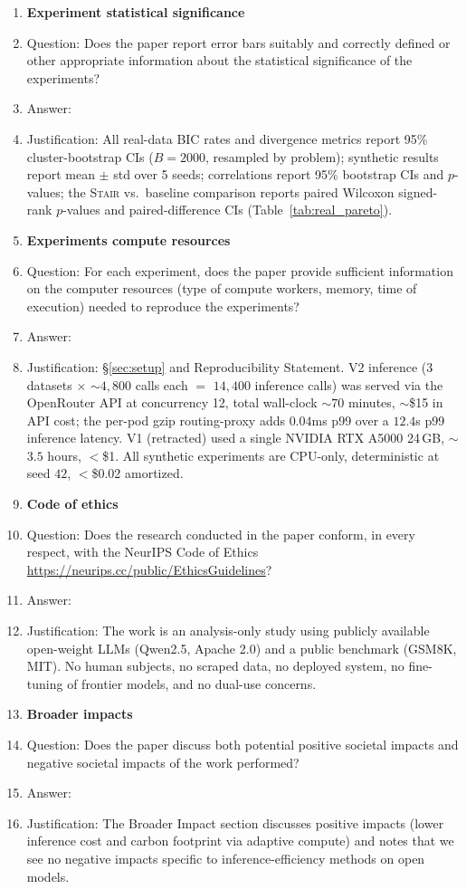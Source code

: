 \documentclass{article}
\newcommand{\method}{\textsc{Stair}}
\begin{document}
\begin{enumerate}
\item {\bf Experiment statistical significance}
    \item[] Question: Does the paper report error bars suitably and correctly defined or other appropriate information about the statistical significance of the experiments?
    \item[] Answer: \answerYes{}
    \item[] Justification: All real-data BIC rates and divergence metrics report 95\% cluster-bootstrap CIs ($B{=}2000$, resampled by problem); synthetic results report mean $\pm$ std over 5 seeds; correlations report 95\% bootstrap CIs and $p$-values; the \method{} vs.\ baseline comparison reports paired Wilcoxon signed-rank $p$-values and paired-difference CIs (Table~\ref{tab:real_pareto}).

\item {\bf Experiments compute resources}
    \item[] Question: For each experiment, does the paper provide sufficient information on the computer resources (type of compute workers, memory, time of execution) needed to reproduce the experiments?
    \item[] Answer: \answerYes{}
    \item[] Justification: \S\ref{sec:setup} and Reproducibility Statement.  V2 inference (3 datasets $\times$ $\sim$$4{,}800$ calls each $=$ $14{,}400$ inference calls) was served via the OpenRouter API at concurrency 12, total wall-clock $\sim$$70$ minutes, $\sim$\$15 in API cost; the per-pod gzip routing-proxy adds $0.04$ms p99 over a $12.4$s p99 inference latency.  V1 (retracted) used a single NVIDIA RTX A5000 24\,GB, $\sim$$3.5$ hours, $<$\$1.  All synthetic experiments are CPU-only, deterministic at seed $42$, $<$\$0.02 amortized.

\item {\bf Code of ethics}
    \item[] Question: Does the research conducted in the paper conform, in every respect, with the NeurIPS Code of Ethics \url{https://neurips.cc/public/EthicsGuidelines}?
    \item[] Answer: \answerYes{}
    \item[] Justification: The work is an analysis-only study using publicly available open-weight LLMs (Qwen2.5, Apache 2.0) and a public benchmark (GSM8K, MIT). No human subjects, no scraped data, no deployed system, no fine-tuning of frontier models, and no dual-use concerns.

\item {\bf Broader impacts}
    \item[] Question: Does the paper discuss both potential positive societal impacts and negative societal impacts of the work performed?
    \item[] Answer: \answerYes{}
    \item[] Justification: The Broader Impact section discusses positive impacts (lower inference cost and carbon footprint via adaptive compute) and notes that we see no negative impacts specific to inference-efficiency methods on open models.


\end{enumerate}
\end{document}
